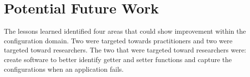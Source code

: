 \documentclass[conference]{IEEEtran}
\begin{document}
\section{Potential Future Work}
The lessons learned identified four areas that could show improvement within the configuration domain. Two were targeted towards practitioners and two were targeted toward researchers. The two that were targeted toward researchers were: create software to better identify getter and setter functions and capture the configurations when an application fails. 
 

%
%


\end{document}
